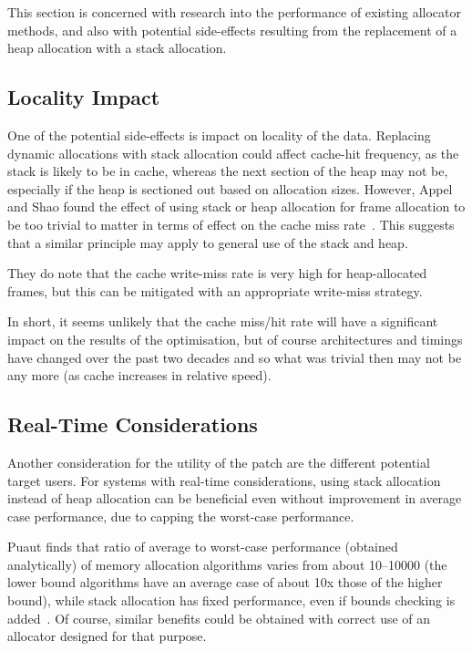 This section is concerned with research into the performance of existing allocator methods, and also with potential side-effects resulting from the replacement of a heap allocation with a stack allocation.

\subsection{Locality Impact}

One of the potential side-effects is impact on locality of the data. Replacing dynamic allocations with stack allocation could affect cache-hit frequency, as the stack is likely to be in cache, whereas the next section of the heap may not be, especially if the heap is sectioned out based on allocation sizes. However, Appel and Shao found the effect of using stack or heap allocation for frame allocation to be too trivial to matter in terms of effect on the cache miss rate~\cite{stackvheap}. This suggests that a similar principle may apply to general use of the stack and heap.

They do note that the cache write-miss rate is very high for heap-allocated frames, but this can be mitigated with an appropriate write-miss strategy.

In short, it seems unlikely that the cache miss/hit rate will have a significant impact on the results of the optimisation, but of course architectures and timings have changed over the past two decades and so what was trivial then may not be any more (as cache increases in relative speed).

\subsection{Real-Time Considerations}

Another consideration for the utility of the patch are the different potential target users. For systems with real-time considerations, using stack allocation instead of heap allocation can be beneficial even without improvement in average case performance, due to capping the worst-case performance.

Puaut finds that ratio of average to worst-case performance (obtained analytically) of memory allocation algorithms varies from about 10–10000 (the lower bound algorithms have an average case of about 10x those of the higher bound), while stack allocation has fixed performance, even if bounds checking is added~\cite{mallocperf}. Of course, similar benefits could be obtained with correct use of an allocator designed for that purpose.

